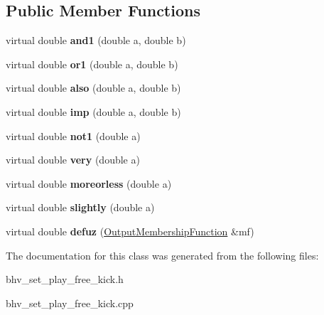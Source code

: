\subsection*{Public Member Functions}
\begin{DoxyCompactItemize}
\item 
\hypertarget{classOP__DecidirJogada__DefinicaoOperador_aa9ebf725f9ed6dd61d7f9e1d47e85a74}{
virtual double {\bfseries and1} (double a, double b)}
\label{classOP__DecidirJogada__DefinicaoOperador_aa9ebf725f9ed6dd61d7f9e1d47e85a74}

\item 
\hypertarget{classOP__DecidirJogada__DefinicaoOperador_ac1185965ad030d6873b8b094d4f0c894}{
virtual double {\bfseries or1} (double a, double b)}
\label{classOP__DecidirJogada__DefinicaoOperador_ac1185965ad030d6873b8b094d4f0c894}

\item 
\hypertarget{classOP__DecidirJogada__DefinicaoOperador_a0da63b6fc25fdbda100a848a3e3ec3e4}{
virtual double {\bfseries also} (double a, double b)}
\label{classOP__DecidirJogada__DefinicaoOperador_a0da63b6fc25fdbda100a848a3e3ec3e4}

\item 
\hypertarget{classOP__DecidirJogada__DefinicaoOperador_ad8bd8c0290a3bd6751391d090c066076}{
virtual double {\bfseries imp} (double a, double b)}
\label{classOP__DecidirJogada__DefinicaoOperador_ad8bd8c0290a3bd6751391d090c066076}

\item 
\hypertarget{classOP__DecidirJogada__DefinicaoOperador_ad4aae089eba188e7c255b58952509af8}{
virtual double {\bfseries not1} (double a)}
\label{classOP__DecidirJogada__DefinicaoOperador_ad4aae089eba188e7c255b58952509af8}

\item 
\hypertarget{classOP__DecidirJogada__DefinicaoOperador_a60fa59df1e72e1af9c44f84743ae4345}{
virtual double {\bfseries very} (double a)}
\label{classOP__DecidirJogada__DefinicaoOperador_a60fa59df1e72e1af9c44f84743ae4345}

\item 
\hypertarget{classOP__DecidirJogada__DefinicaoOperador_a0d30f77415f098d7ac8084569c9c7f81}{
virtual double {\bfseries moreorless} (double a)}
\label{classOP__DecidirJogada__DefinicaoOperador_a0d30f77415f098d7ac8084569c9c7f81}

\item 
\hypertarget{classOP__DecidirJogada__DefinicaoOperador_a5357ba9174d5436e192131eb33dcdafe}{
virtual double {\bfseries slightly} (double a)}
\label{classOP__DecidirJogada__DefinicaoOperador_a5357ba9174d5436e192131eb33dcdafe}

\item 
\hypertarget{classOP__DecidirJogada__DefinicaoOperador_ab9fdaf88c21fa75e63fdbd268af0bec4}{
virtual double {\bfseries defuz} (\hyperlink{classOutputMembershipFunction}{OutputMembershipFunction} \&mf)}
\label{classOP__DecidirJogada__DefinicaoOperador_ab9fdaf88c21fa75e63fdbd268af0bec4}

\end{DoxyCompactItemize}


The documentation for this class was generated from the following files:\begin{DoxyCompactItemize}
\item 
bhv\_\-set\_\-play\_\-free\_\-kick.h\item 
bhv\_\-set\_\-play\_\-free\_\-kick.cpp\end{DoxyCompactItemize}
